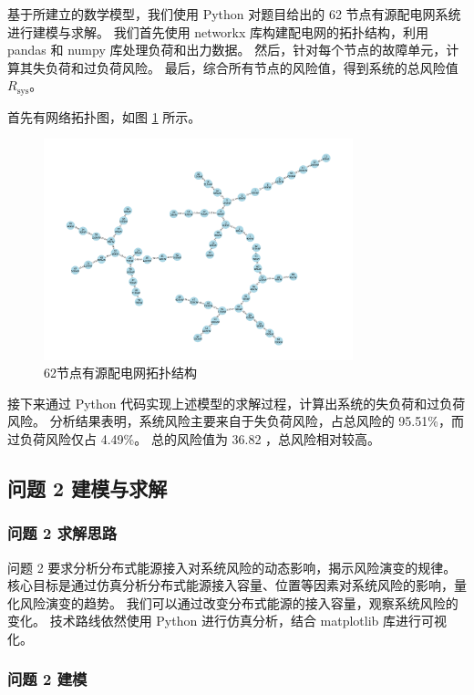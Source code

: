 \documentclass{article}
\begin{document}
基于所建立的数学模型，我们使用 Python 对题目给出的 62 节点有源配电网系统进行建模与求解。
我们首先使用 networkx 库构建配电网的拓扑结构，利用 pandas 和 numpy 库处理负荷和出力数据。
然后，针对每个节点的故障单元，计算其失负荷和过负荷风险。
最后，综合所有节点的风险值，得到系统的总风险值 $R_{\text{sys}}$。

首先有网络拓扑图，如图 \ref{fig:network_topology} 所示。

\begin{figure}[htbp]
  \centering
  \includegraphics[width=0.8\textwidth]{problem1/topology_graph.png}
  \caption{62节点有源配电网拓扑结构}
  \label{fig:network_topology}
\end{figure}

接下来通过 Python 代码实现上述模型的求解过程，计算出系统的失负荷和过负荷风险。
分析结果表明，系统风险主要来自于失负荷风险，占总风险的 95.51\%，而过负荷风险仅占 4.49\%。
总的风险值为 36.82 ，总风险相对较高。

\subsection{问题 2 建模与求解}\label{subsec:problem2}

\subsubsection{问题 2 求解思路}\label{subsubsec:problem2_idea}

问题 2 要求分析分布式能源接入对系统风险的动态影响，揭示风险演变的规律。
核心目标是通过仿真分析分布式能源接入容量、位置等因素对系统风险的影响，量化风险演变的趋势。
我们可以通过改变分布式能源的接入容量，观察系统风险的变化。
技术路线依然使用 Python 进行仿真分析，结合 matplotlib 库进行可视化。

\subsubsection{问题 2 建模}\label{subsubsec:problem2_model}
\end{document}
